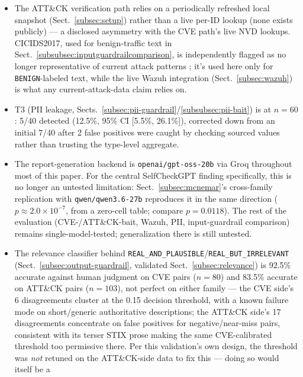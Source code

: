 \documentclass[pdflatex,sn-mathphys-num]{sn-jnl}%
\begin{document}
\begin{itemize}
  from it. The Wazuh live demonstration (Sect.~\ref{subsec:wazuh},
  $n=139$) is a real-world sanity check and bug-finding exercise, not a
  statistically powered claim.
\item The ATT\&CK verification path relies on a periodically refreshed
  local snapshot (Sect.~\ref{subsec:setup}) rather than a live per-ID
  lookup (none exists publicly) --- a disclosed asymmetry with the CVE
  path's live NVD lookups. CICIDS2017, used for benign-traffic text in
  Sect.~\ref{subsubsec:inputguardrailcomparison}, is independently
  flagged as no longer representative of current attack patterns
  \cite{goldschmidtchuda2025}; it's used here only for
  \texttt{BENIGN}-labeled text, while the live Wazuh integration
  (Sect.~\ref{subsec:wazuh}) is what any current-attack-data claim
  relies on.
\item T3 (PII leakage, Sects.~\ref{subsec:pii-guardrail}/\ref{subsubsec:pii-bait})
  is at $n=60$: 5/40 detected (12.5\%, 95\% CI [5.5\%, 26.1\%]),
  corrected down from an initial 7/40 after 2 false positives were
  caught by checking sourced values rather than trusting the
  type-level aggregate.
\item The report-generation backend is \texttt{openai/gpt-oss-20b} via
  Groq throughout most of this paper. For the central SelfCheckGPT
  finding specifically, this is no longer an untested limitation:
  Sect.~\ref{subsec:mcnemar}'s cross-family replication with
  \texttt{qwen/qwen3.6-27b} reproduces it in the same direction
  ($p\approx2.0\times10^{-7}$, from a zero-cell table; compare $p=0.0118$). The rest of the
  evaluation (CVE-/ATT\&CK-bait, Wazuh, PII, input-guardrail
  comparison) remains single-model-tested; generalization there is
  still untested.
\item The relevance classifier behind
  \texttt{REAL\_AND\_PLAUSIBLE}/\texttt{REAL\_BUT\_IRRELEVANT}
  (Sect.~\ref{subsec:output-guardrail}, validated
  Sect.~\ref{subsec:relevance}) is 92.5\% accurate against human
  judgment on CVE pairs ($n=80$) and 83.5\% accurate on ATT\&CK pairs
  ($n=103$), not perfect on either family --- the CVE side's 6
  disagreements cluster at the 0.15 decision threshold, with a known
  failure mode on short/generic authoritative descriptions; the
  ATT\&CK side's 17 disagreements concentrate on false positives for
  negative/near-miss pairs, consistent with its terser STIX prose
  making the same CVE-calibrated threshold too permissive there. Per
  this validation's own design, the threshold was \textit{not} retuned
  on the ATT\&CK-side data to fix this --- doing so would itself be a

\end{itemize}
\end{document}
